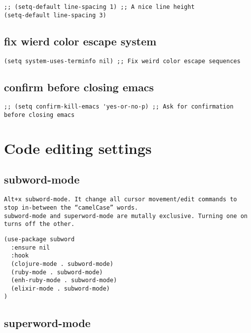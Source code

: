 \documentclass[11pt]{article}
\begin{document}
\begin{verbatim}
;; (setq-default line-spacing 1) ;; A nice line height
(setq-default line-spacing 3)
\end{verbatim}

\subsection*{fix wierd color escape system}
\label{sec:org2f718cb}

\begin{verbatim}
(setq system-uses-terminfo nil) ;; Fix weird color escape sequences
\end{verbatim}

\subsection*{confirm before closing emacs}
\label{sec:orgb9138fa}

\begin{verbatim}
;; (setq confirm-kill-emacs 'yes-or-no-p) ;; Ask for confirmation before closing emacs
\end{verbatim}


\section*{Code editing settings}
\label{sec:org4faa648}
\subsection*{subword-mode}
\label{sec:org53bd712}

\begin{verbatim}
Alt+x subword-mode. It change all cursor movement/edit commands to stop in-between the “camelCase” words.
subword-mode and superword-mode are mutally exclusive. Turning one on turns off the other.
\end{verbatim}


\begin{verbatim}
(use-package subword
  :ensure nil
  :hook
  (clojure-mode . subword-mode)
  (ruby-mode . subword-mode)
  (enh-ruby-mode . subword-mode)
  (elixir-mode . subword-mode)
)
\end{verbatim}

\subsection*{superword-mode}
\label{sec:org6799a96}
\end{document}
